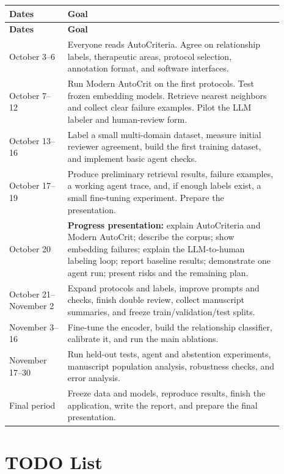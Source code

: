\documentclass[11pt]{article}
\begin{document}
\begin{longtable}{>{\raggedright\arraybackslash}p{0.19\linewidth} >{\raggedright\arraybackslash}p{0.70\linewidth}}
\toprule
\textbf{Dates} & \textbf{Goal} \\
\midrule
\endfirsthead
\toprule
\textbf{Dates} & \textbf{Goal} \\
\midrule
\endhead
October 3--6 & Everyone reads AutoCriteria. Agree on relationship labels, therapeutic areas, protocol selection, annotation format, and software interfaces. \\
October 7--12 & Run Modern AutoCrit on the first protocols. Test frozen embedding models. Retrieve nearest neighbors and collect clear failure examples. Pilot the LLM labeler and human-review form. \\
October 13--16 & Label a small multi-domain dataset, measure initial reviewer agreement, build the first training dataset, and implement basic agent checks. \\
October 17--19 & Produce preliminary retrieval results, failure examples, a working agent trace, and, if enough labels exist, a small fine-tuning experiment. Prepare the presentation. \\
October 20 & \textbf{Progress presentation:} explain AutoCriteria and Modern AutoCrit; describe the corpus; show embedding failures; explain the LLM-to-human labeling loop; report baseline results; demonstrate one agent run; present risks and the remaining plan. \\
October 21--November 2 & Expand protocols and labels, improve prompts and checks, finish double review, collect manuscript summaries, and freeze train/validation/test splits. \\
November 3--16 & Fine-tune the encoder, build the relationship classifier, calibrate it, and run the main ablations. \\
November 17--30 & Run held-out tests, agent and abstention experiments, manuscript population analysis, robustness checks, and error analysis. \\
Final period & Freeze data and models, reproduce results, finish the application, write the report, and prepare the final presentation. \\
\bottomrule
\end{longtable}

\section{TODO List}
\end{document}
